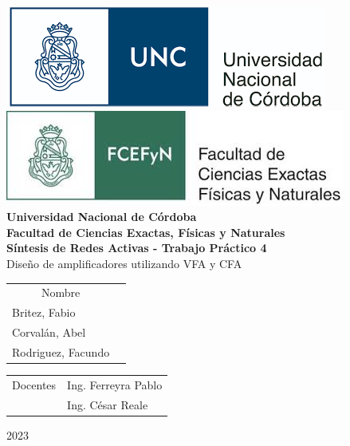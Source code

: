 \documentclass[12pt,A4paper,titlepage]{article}
\begin{document}
\begin{titlepage}

\thispagestyle{empty}



\begin{center}
    \includegraphics[scale=0.4]{Imagenes/unc_logo.png}
    \includegraphics[scale=0.4]{Imagenes/fcefyn_logo.jpg}
    \\[1cm]
    \vspace{5pt}
    \LARGE \textbf{Universidad Nacional de Córdoba}\\[0.5cm] 
    \large \textbf{Facultad de Ciencias Exactas, Físicas y Naturales} \\[0.5cm] 
    \large \textbf{Síntesis de Redes Activas - Trabajo Práctico 4}
    \\[0.5cm]
    \large Diseño de amplificadores utilizando VFA y CFA
    \\[0.2cm] 
    \vspace{60pt}
    \begin{table}[!h]
    \centering
    \begin{tabular}{ll}
    \multicolumn{1}{c}{Nombre}  \\
    Britez, Fabio\\
    Corvalán, Abel\\
    Rodriguez, Facundo
    \end{tabular}
    \end{table}
    \vspace{20pt}
    \begin{table}[!h]
    \centering
    \begin{tabular}{ll}
    \multicolumn{1}{c}{Docentes} & Ing. Ferreyra Pablo \\ & Ing. César Reale \\
    \end{tabular}
    \end{table}
    \vspace{20pt}
    \large 2023
\end{center}

\end{titlepage}
\end{document}
